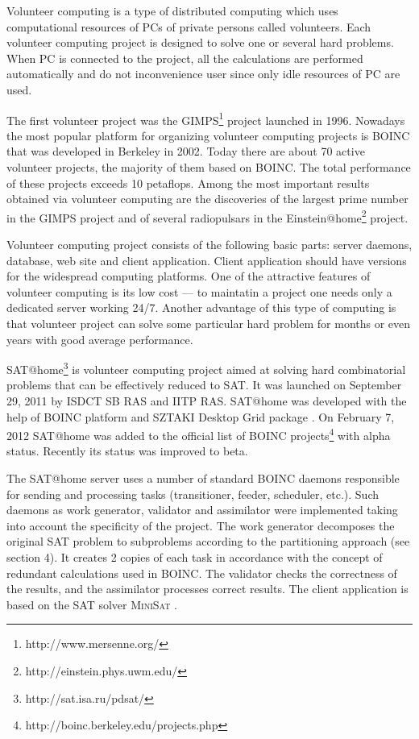 \documentclass[runningheads,a4paper]{llncs}
\begin{document}
Volunteer computing \cite{DBLP:journals/jnca/DurraniS14} is a type of distributed computing which uses computational resources of PCs of private persons called volunteers. Each volunteer computing project is designed to solve one or several hard problems. When PC is connected to the project, all the calculations are performed automatically and do not inconvenience user since only idle resources of PC are used.

The first volunteer project was the GIMPS\footnote{http://www.mersenne.org/} project launched in 1996. Nowadays the most popular platform for organizing volunteer computing projects is BOINC \cite{DBLP:conf/grid/Anderson04} that was developed in Berkeley in 2002. Today there are about 70 active volunteer projects, the majority of them based on BOINC. The total performance of these projects exceeds 10 petaflops. Among the most important results obtained via volunteer computing are the discoveries of the largest prime number in the GIMPS project and of several radiopulsars in the Einstein@home\footnote{http://einstein.phys.uwm.edu/} project. 

Volunteer computing project consists of the following basic parts: server daemons, database, web site and client application. Client application should have versions for the widespread computing platforms. One of the attractive features of volunteer computing is its low cost --- to maintatin a project one needs only a dedicated server working 24/7. Another advantage of this type of computing is that volunteer project can solve some particular hard problem for months or even years with good average performance.

SAT@home\footnote{http://sat.isa.ru/pdsat/} \cite{journals/csj/Posypkin12} is volunteer computing project aimed at solving hard combinatorial problems that can be effectively reduced to SAT. It was launched on September 29, 2011 by ISDCT SB RAS and IITP RAS. SAT@home was developed with the help of BOINC platform  \cite{DBLP:conf/grid/Anderson04} and SZTAKI Desktop Grid package \cite{sztaki6003}. On February 7, 2012 SAT@home was added to the official list of BOINC projects\footnote{http://boinc.berkeley.edu/projects.php} with alpha status. Recently its status was improved to beta.

The SAT@home server uses a number of standard BOINC daemons responsible for sending and processing tasks (transitioner, feeder, scheduler, etc.). Such daemons as work generator, validator and assimilator were implemented taking into account the specificity of the project. The work generator decomposes the original SAT problem to subproblems according to the partitioning approach (see section 4). It creates 2 copies of each task in accordance with the concept of redundant calculations used in BOINC. The validator checks the correctness of the results, and the assimilator processes correct results. The client application is based on the SAT solver \textsc{MiniSat} \cite{DBLP:conf/sat/EenS03}.
\end{document}
